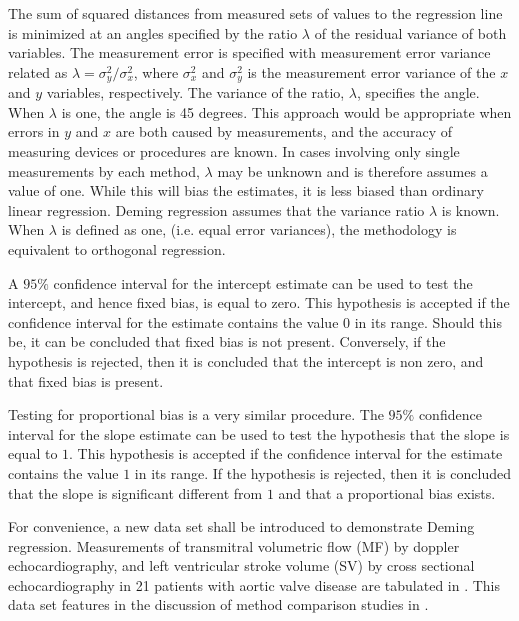 \documentclass[12pt, a4paper]{report}
\theoremstyle{plain}
\theoremstyle{definition}
\theoremstyle{remark}
\begin{document}
The sum of squared distances from measured sets of values to the regression line is minimized at an angles specified by the ratio $\lambda$ of the residual variance of both variables. The measurement error is specified with measurement error variance related as 
$\displaystyle{\lambda =\sigma^2_y/\sigma^2_x}$, where $\sigma^2_x$ and $\sigma^2_y$ is the measurement error variance of the $x$ and $y$ variables, respectively.
The variance of the ratio, $\lambda$, specifies the angle. When $\lambda$ is one, the angle is 45 degrees. 
This approach would be appropriate when errors in $y$ and $x$ are both caused by measurements, and the accuracy of measuring devices or procedures are known. In cases involving only single measurements by each method, $\lambda$ may be unknown and is therefore assumes a value of one. While this will bias the estimates, it is less biased than ordinary linear regression. Deming regression assumes that the variance ratio $\lambda$ is known. When $\lambda$ is defined as one, (i.e. equal error variances), the methodology is equivalent to orthogonal regression.


A $95\%$ confidence interval for the intercept estimate can be
used to test the intercept, and hence fixed bias, is equal to
zero. This hypothesis is accepted if the confidence interval for
the estimate contains the value $0$ in its range. Should this be,
it can be concluded that fixed bias is not present. Conversely, if
the hypothesis is rejected, then it is concluded that the
intercept is non zero, and that fixed bias is present.

Testing for proportional bias is a very similar procedure. The
$95\%$ confidence interval for the slope estimate can be used to
test the hypothesis that the slope is equal to $1$. This hypothesis is accepted if the confidence interval for the estimate contains the value $1$ in its range. If the hypothesis is rejected, then it is concluded that the slope is significant different from $1$ and that a proportional bias exists.

For convenience, a new data set shall be introduced to demonstrate
Deming regression. Measurements of transmitral volumetric flow
(MF) by doppler echocardiography, and left ventricular stroke
volume (SV) by cross sectional echocardiography in 21 patients
with aortic valve disease are tabulated in \citet{zhang}. This
data set features in the discussion of method comparison studies
in \citet[p.398]{AltmanBook} .
\end{document}
